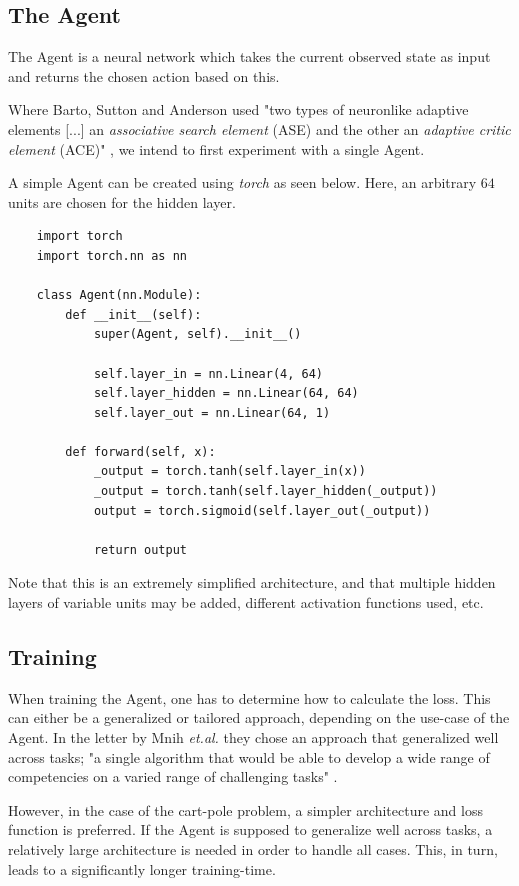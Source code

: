 \documentclass{article}
\renewenvironment{leftbar}[1][\hsize]{
    \def\FrameCommand{{\color{barcolor}\vrule width 2pt \hspace{10pt}}}
    \MakeFramed{\hsize#1 \advance\hsize-\width \FrameRestore}
}{\endMakeFramed}
\begin{document}
\subsection*{The Agent}
\begin{leftbar}
    The Agent is a neural network which takes the current observed state as input and returns the chosen action based on this.

    Where Barto, Sutton and Anderson used "two types of neuronlike adaptive elements [...] an \textit{associative search element} (ASE) and the other an \textit{adaptive critic element} (ACE)" \cite{Neuronlike}, we intend to first experiment with a single Agent.

    A simple Agent can be created using \textit{torch} as seen below. Here, an arbitrary $64$ units are chosen for the hidden layer.

    \begin{lstlisting}
    import torch
    import torch.nn as nn
    
    class Agent(nn.Module):
        def __init__(self):
            super(Agent, self).__init__()
            
            self.layer_in = nn.Linear(4, 64)
            self.layer_hidden = nn.Linear(64, 64)
            self.layer_out = nn.Linear(64, 1)
            
        def forward(self, x):
            _output = torch.tanh(self.layer_in(x))
            _output = torch.tanh(self.layer_hidden(_output))
            output = torch.sigmoid(self.layer_out(_output))
            
            return output
    \end{lstlisting}

    Note that this is an extremely simplified architecture, and that multiple hidden layers of variable units may be added, different activation functions used, etc.
    
\end{leftbar}
\subsection*{Training}
\begin{leftbar}
    When training the Agent, one has to determine how to calculate the loss. This can either be a generalized or tailored approach, depending on the use-case of the Agent. In the letter by Mnih \textit{et.al.} they chose an approach that generalized well across tasks; "a single algorithm that would be able to develop a wide range of competencies on a varied range of challenging tasks" \cite{Human-level}. 
    
    However, in the case of the cart-pole problem, a simpler architecture and loss function is preferred. If the Agent is supposed to generalize well across tasks, a relatively large architecture is needed in order to handle all cases. This, in turn, leads to a significantly longer training-time.
\end{leftbar}


\newpage
\printbibliography
\end{document}
